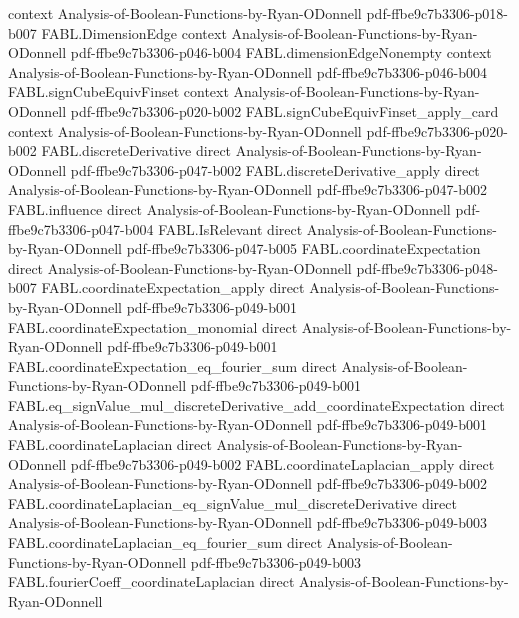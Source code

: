 \begin{theorem}
  {context}
  {Analysis-of-Boolean-Functions-by-Ryan-ODonnell}
  {pdf-ffbe9c7b3306-p018-b007}
\proofstep
  {FABL.DimensionEdge}
  {context}
  {Analysis-of-Boolean-Functions-by-Ryan-ODonnell}
  {pdf-ffbe9c7b3306-p046-b004}
\proofstep
  {FABL.dimensionEdgeNonempty}
  {context}
  {Analysis-of-Boolean-Functions-by-Ryan-ODonnell}
  {pdf-ffbe9c7b3306-p046-b004}
\proofstep
  {FABL.signCubeEquivFinset}
  {context}
  {Analysis-of-Boolean-Functions-by-Ryan-ODonnell}
  {pdf-ffbe9c7b3306-p020-b002}
\proofstep
  {FABL.signCubeEquivFinset_apply_card}
  {context}
  {Analysis-of-Boolean-Functions-by-Ryan-ODonnell}
  {pdf-ffbe9c7b3306-p020-b002}
\proofstep
  {FABL.discreteDerivative}
  {direct}
  {Analysis-of-Boolean-Functions-by-Ryan-ODonnell}
  {pdf-ffbe9c7b3306-p047-b002}
\proofstep
  {FABL.discreteDerivative_apply}
  {direct}
  {Analysis-of-Boolean-Functions-by-Ryan-ODonnell}
  {pdf-ffbe9c7b3306-p047-b002}
\proofstep
  {FABL.influence}
  {direct}
  {Analysis-of-Boolean-Functions-by-Ryan-ODonnell}
  {pdf-ffbe9c7b3306-p047-b004}
\proofstep
  {FABL.IsRelevant}
  {direct}
  {Analysis-of-Boolean-Functions-by-Ryan-ODonnell}
  {pdf-ffbe9c7b3306-p047-b005}
\proofstep
  {FABL.coordinateExpectation}
  {direct}
  {Analysis-of-Boolean-Functions-by-Ryan-ODonnell}
  {pdf-ffbe9c7b3306-p048-b007}
\proofstep
  {FABL.coordinateExpectation_apply}
  {direct}
  {Analysis-of-Boolean-Functions-by-Ryan-ODonnell}
  {pdf-ffbe9c7b3306-p049-b001}
\proofstep
  {FABL.coordinateExpectation_monomial}
  {direct}
  {Analysis-of-Boolean-Functions-by-Ryan-ODonnell}
  {pdf-ffbe9c7b3306-p049-b001}
\proofstep
  {FABL.coordinateExpectation_eq_fourier_sum}
  {direct}
  {Analysis-of-Boolean-Functions-by-Ryan-ODonnell}
  {pdf-ffbe9c7b3306-p049-b001}
\proofstep
  {FABL.eq_signValue_mul_discreteDerivative_add_coordinateExpectation}
  {direct}
  {Analysis-of-Boolean-Functions-by-Ryan-ODonnell}
  {pdf-ffbe9c7b3306-p049-b001}
\proofstep
  {FABL.coordinateLaplacian}
  {direct}
  {Analysis-of-Boolean-Functions-by-Ryan-ODonnell}
  {pdf-ffbe9c7b3306-p049-b002}
\proofstep
  {FABL.coordinateLaplacian_apply}
  {direct}
  {Analysis-of-Boolean-Functions-by-Ryan-ODonnell}
  {pdf-ffbe9c7b3306-p049-b002}
\proofstep
  {FABL.coordinateLaplacian_eq_signValue_mul_discreteDerivative}
  {direct}
  {Analysis-of-Boolean-Functions-by-Ryan-ODonnell}
  {pdf-ffbe9c7b3306-p049-b003}
\proofstep
  {FABL.coordinateLaplacian_eq_fourier_sum}
  {direct}
  {Analysis-of-Boolean-Functions-by-Ryan-ODonnell}
  {pdf-ffbe9c7b3306-p049-b003}
\proofstep
  {FABL.fourierCoeff_coordinateLaplacian}
  {direct}
  {Analysis-of-Boolean-Functions-by-Ryan-ODonnell}

\end{theorem}
